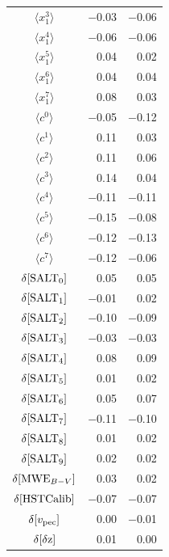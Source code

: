 \documentclass[a4paper,fleqn,usenatbib]{emulateapj}
\begin{document}
\begin{table}
\begin{tabular}{c|rr}
		$\langle x_1^{3} \rangle$ &   $-$0.03 &     $-$0.06     \\
		$\langle x_1^{4} \rangle$ &   $-$0.06 &     $-$0.06     \\
		$\langle x_1^{5} \rangle$ &    0.04 &      0.02     \\
		$\langle x_1^{6} \rangle$ &    0.04 &      0.04     \\
		$\langle x_1^{7} \rangle$ &    0.08 &      0.03     \\
		$\langle c^{0} \rangle$ &   $-$0.05 &     $-$0.12     \\
		$\langle c^{1} \rangle$ &    0.11 &      0.03     \\
		$\langle c^{2} \rangle$ &    0.11 &      0.06     \\
		$\langle c^{3} \rangle$ &    0.14 &      0.04     \\
		$\langle c^{4} \rangle$ &   $-$0.11 &     $-$0.11     \\
		$\langle c^{5} \rangle$ &   $-$0.15 &     $-$0.08     \\
		$\langle c^{6} \rangle$ &   $-$0.12 &     $-$0.13     \\
		$\langle c^{7} \rangle$ &   $-$0.12 &     $-$0.06     \\
		$\delta [ {\rm SALT}_0 ]$ &    0.05 &      0.05     \\
		$\delta [ {\rm SALT}_1 ]$ &   $-$0.01 &      0.02     \\
		$\delta [ {\rm SALT}_2 ]$ &   $-$0.10 &     $-$0.09     \\
		$\delta [ {\rm SALT}_3 ]$ &   $-$0.03 &     $-$0.03     \\
		$\delta [ {\rm SALT}_4 ]$ &    0.08 &      0.09     \\
		$\delta [ {\rm SALT}_5 ]$ &    0.01 &      0.02     \\
		$\delta [ {\rm SALT}_6 ]$ &    0.05 &      0.07     \\
		$\delta [ {\rm SALT}_7 ]$ &   $-$0.11 &     $-$0.10     \\
		$\delta [ {\rm SALT}_8 ]$ &    0.01 &      0.02     \\
		$\delta [ {\rm SALT}_9 ]$ &    0.02 &      0.02     \\
		$\delta [ {\rm MWE}_{B-V} ]$ &    0.03 &      0.02     \\
		$\delta [ {\rm HST Calib} ]$ &   $-$0.07 &     $-$0.07     \\
		$\delta [ v_{\rm pec} ]$ &    0.00 &     $-$0.01     \\
		$\delta [ {\rm \delta z } ]$ &    0.01 &      0.00     \\

\end{tabular}
\end{table}
\end{document}
